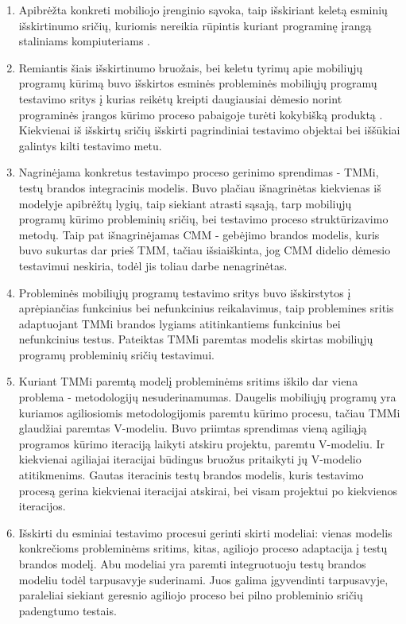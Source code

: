\documentclass{VUMIFPSkursinis}
\begin{document}
\begin{enumerate}
\item  Apibrėžta konkreti mobiliojo įrenginio sąvoka, taip išskiriant keletą esminių išskirtinumo sričių, kuriomis nereikia rūpintis kuriant programinę įrangą staliniams kompiuteriams \cite{Satyanarayanan:1996:FCM:248052.248053}.

\item Remiantis šiais išskirtinumo bruožais, bei keletu tyrimų apie mobiliųjų programų kūrimą buvo išskirtos esminės probleminės mobiliųjų programų testavimo sritys į kurias reikėtų kreipti daugiausiai dėmesio norint programinės įrangos kūrimo proceso pabaigoje turėti kokybišką produktą  \cite{Muccini:2012:STM:2663608.2663615, 6496451}. Kiekvienai iš išskirtų sričių išskirti pagrindiniai testavimo objektai bei iššūkiai galintys kilti testavimo metu.

\item Nagrinėjama konkretus testavimpo proceso gerinimo sprendimas - TMMi, testų brandos integracinis modelis. Buvo plačiau išnagrinėtas kiekvienas iš modelyje apibrėžtų lygių, taip siekiant atrasti sąsają, tarp mobiliųjų programų kūrimo probleminių sričių, bei testavimo proceso struktūrizavimo metodų. Taip pat išnagrinėjamas CMM - gebėjimo brandos modelis, kuris buvo sukurtas dar prieš TMM, tačiau išsiaiškinta, jog CMM didelio dėmesio testavimui neskiria, todėl jis toliau darbe nenagrinėtas.

\item Probleminės mobiliųjų programų testavimo sritys buvo išskirstytos į aprėpiančias funkcinius bei nefunkcinius reikalavimus, taip problemines sritis adaptuojant TMMi brandos lygiams atitinkantiems funkcinius bei nefunkcinius testus. Pateiktas TMMi paremtas modelis skirtas mobiliųjų programų probleminių sričių testavimui.

\item Kuriant TMMi paremtą modelį probleminėms sritims iškilo dar viena problema - metodologijų nesuderinamumas. Daugelis mobiliųjų programų yra kuriamos agiliosiomis metodologijomis paremtu kūrimo procesu, tačiau TMMi glaudžiai paremtas V-modeliu. Buvo priimtas sprendimas vieną agiliąją programos kūrimo iteraciją laikyti atskiru projektu, paremtu V-modeliu. Ir kiekvienai agiliajai iteracijai būdingus bruožus pritaikyti jų V-modelio atitikmenims. Gautas iteracinis testų brandos modelis, kuris testavimo procesą gerina kiekvienai iteracijai atskirai, bei visam projektui po kiekvienos iteracijos.

\item Išskirti du esminiai testavimo procesui gerinti skirti modeliai: vienas modelis konkrečioms probleminėms sritims, kitas, agiliojo proceso adaptacija į testų brandos modelį. Abu modeliai yra paremti integruotuoju testų brandos modeliu todėl tarpusavyje suderinami. Juos galima įgyvendinti tarpusavyje, paraleliai siekiant geresnio agiliojo proceso bei pilno probleminio sričių padengtumo testais.
\end{enumerate}
\end{document}
